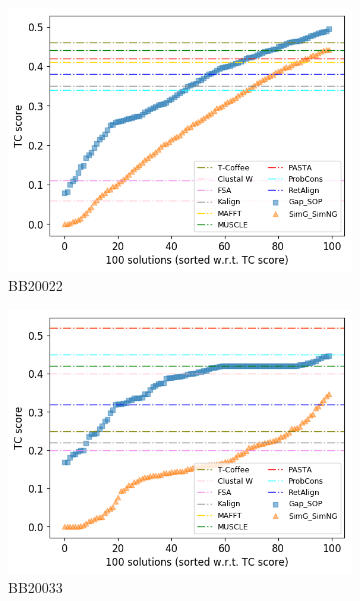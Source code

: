 \begin{figure}[!htbp]
\begin{adjustwidth}{-1cm}{-1cm}
\begin{subfigure}{0.22\textwidth}
			\includegraphics[width=\columnwidth]{Figure/summary/precomputedInit/Balibase/BB20022_tc_density_single_run_2}
			\caption{BB20022}
		\end{subfigure}
		\begin{subfigure}{0.22\textwidth}
			\includegraphics[width=\columnwidth]{Figure/summary/precomputedInit/Balibase/BB20033_tc_density_single_run_2}
			\caption{BB20033}
		\end{subfigure}
		\begin{subfigure}{0.22\textwidth}

\end{subfigure}
\end{adjustwidth}
\end{figure}
